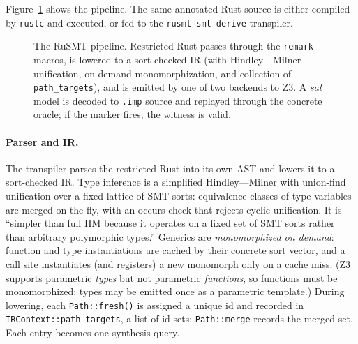 \documentclass[11pt,a4paper]{article}
\theoremstyle{definition}
\theoremstyle{remark}
\newcommand{\rusmt}{RuSMT}
\newcommand{\code}[1]{\texttt{#1}}
\begin{document}
Figure~\ref{fig:pipeline} shows the pipeline. The same annotated Rust source is
either compiled by \code{rustc} and executed, or fed to the \code{rusmt-smt-derive}
transpiler.

\begin{figure}[t]
\centering
\resizebox{\textwidth}{!}{}
\caption{The \rusmt{} pipeline. Restricted Rust passes through the
\code{remark} macros, is lowered to a sort-checked IR (with Hindley---Milner
unification, on-demand monomorphization, and collection of \code{path\_targets}),
and is emitted by one of two backends to Z3. A \emph{sat} model is decoded to
\code{.imp} source and replayed through the concrete oracle; if the marker fires,
the witness is valid.}
\label{fig:pipeline}
\end{figure}

\paragraph{Parser and IR.}
The transpiler parses the restricted Rust into its own AST and lowers it to a
sort-checked IR. Type inference is a simplified Hindley---Milner with union-find
unification over a fixed lattice of SMT sorts: equivalence classes of type
variables are merged on the fly, with an occurs check that rejects cyclic
unification. It is ``simpler than full HM because it operates on a fixed set of
SMT sorts rather than arbitrary polymorphic types.'' Generics are
\emph{monomorphized on demand}: function and type instantiations are cached by
their concrete sort vector, and a call site instantiates (and registers) a new
monomorph only on a cache miss. (Z3 supports parametric \emph{types} but not
parametric \emph{functions}, so functions must be monomorphized; types may be
emitted once as a parametric template.) During lowering, each \code{Path::fresh()}
is assigned a unique id and recorded in \code{IRContext::path\_targets}, a list of
id-sets; \code{Path::merge} records the merged set. Each entry becomes one
synthesis query.
\end{document}
